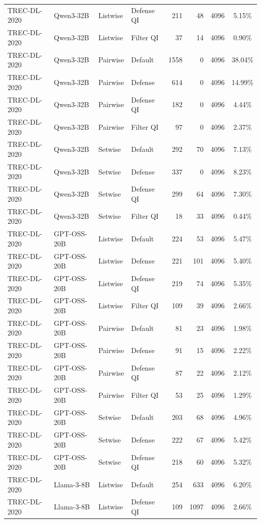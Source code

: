\begin{table}[t]
\begin{tabular}{ll l l r r r c}
TREC-DL-2020 & Qwen3-32B & Listwise & Defense QI & 211 & 48 & 4096 & 5.15\% \\
TREC-DL-2020 & Qwen3-32B & Listwise & Filter QI & 37 & 14 & 4096 & 0.90\% \\
TREC-DL-2020 & Qwen3-32B & Pairwise & Default & 1558 & 0 & 4096 & 38.04\% \\
TREC-DL-2020 & Qwen3-32B & Pairwise & Defense & 614 & 0 & 4096 & 14.99\% \\
TREC-DL-2020 & Qwen3-32B & Pairwise & Defense QI & 182 & 0 & 4096 & 4.44\% \\
TREC-DL-2020 & Qwen3-32B & Pairwise & Filter QI & 97 & 0 & 4096 & 2.37\% \\
TREC-DL-2020 & Qwen3-32B & Setwise & Default & 292 & 70 & 4096 & 7.13\% \\
TREC-DL-2020 & Qwen3-32B & Setwise & Defense & 337 & 0 & 4096 & 8.23\% \\
TREC-DL-2020 & Qwen3-32B & Setwise & Defense QI & 299 & 64 & 4096 & 7.30\% \\
TREC-DL-2020 & Qwen3-32B & Setwise & Filter QI & 18 & 33 & 4096 & 0.44\% \\
TREC-DL-2020 & GPT-OSS-20B & Listwise & Default & 224 & 53 & 4096 & 5.47\% \\
TREC-DL-2020 & GPT-OSS-20B & Listwise & Defense & 221 & 101 & 4096 & 5.40\% \\
TREC-DL-2020 & GPT-OSS-20B & Listwise & Defense QI & 219 & 74 & 4096 & 5.35\% \\
TREC-DL-2020 & GPT-OSS-20B & Listwise & Filter QI & 109 & 39 & 4096 & 2.66\% \\
TREC-DL-2020 & GPT-OSS-20B & Pairwise & Default & 81 & 23 & 4096 & 1.98\% \\
TREC-DL-2020 & GPT-OSS-20B & Pairwise & Defense & 91 & 15 & 4096 & 2.22\% \\
TREC-DL-2020 & GPT-OSS-20B & Pairwise & Defense QI & 87 & 22 & 4096 & 2.12\% \\
TREC-DL-2020 & GPT-OSS-20B & Pairwise & Filter QI & 53 & 25 & 4096 & 1.29\% \\
TREC-DL-2020 & GPT-OSS-20B & Setwise & Default & 203 & 68 & 4096 & 4.96\% \\
TREC-DL-2020 & GPT-OSS-20B & Setwise & Defense & 222 & 67 & 4096 & 5.42\% \\
TREC-DL-2020 & GPT-OSS-20B & Setwise & Defense QI & 218 & 60 & 4096 & 5.32\% \\
TREC-DL-2020 & Llama-3-8B & Listwise & Default & 254 & 633 & 4096 & 6.20\% \\
TREC-DL-2020 & Llama-3-8B & Listwise & Defense QI & 109 & 1097 & 4096 & 2.66\% \\

\end{tabular}
\end{table}
